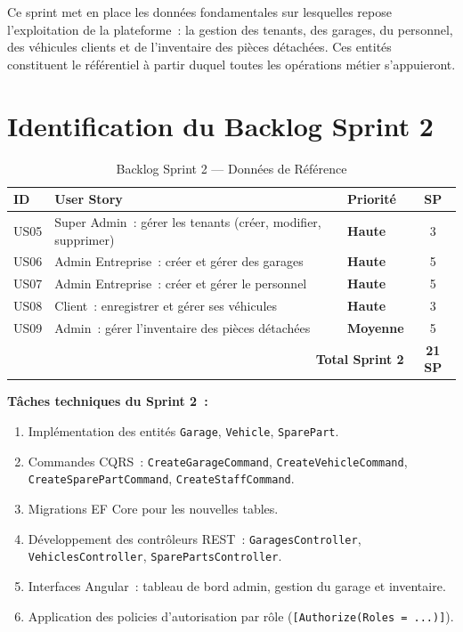 \documentclass[12pt,a4paper]{report}
\begin{document}
Ce sprint met en place les données fondamentales sur lesquelles repose l'exploitation
de la plateforme~: la gestion des tenants, des garages, du personnel, des véhicules
clients et de l'inventaire des pièces détachées. Ces entités constituent le référentiel
à partir duquel toutes les opérations métier s'appuieront.

\section{Identification du Backlog Sprint 2}

\begin{table}[H]
\centering
\caption{Backlog Sprint 2 — Données de Référence}
\begin{tabularx}{\textwidth}{|l|X|l|c|}
\hline
\rowcolor{indigolite!60}
\textbf{ID} & \textbf{User Story} & \textbf{Priorité} & \textbf{SP} \\
\hline
US05 & Super Admin~: gérer les tenants (créer, modifier, supprimer) &
  \textcolor{prioH}{\bfseries Haute} & 3 \\
\hline
US06 & Admin Entreprise~: créer et gérer des garages &
  \textcolor{prioH}{\bfseries Haute} & 5 \\
\hline
US07 & Admin Entreprise~: créer et gérer le personnel &
  \textcolor{prioH}{\bfseries Haute} & 5 \\
\hline
US08 & Client~: enregistrer et gérer ses véhicules &
  \textcolor{prioH}{\bfseries Haute} & 3 \\
\hline
US09 & Admin~: gérer l'inventaire des pièces détachées &
  \textcolor{prioM}{\bfseries Moyenne} & 5 \\
\hline
\multicolumn{3}{|r|}{\textbf{Total Sprint 2}} & \textbf{21 SP} \\
\hline
\end{tabularx}
\end{table}

\noindent\textbf{Tâches techniques du Sprint 2~:}
\begin{enumerate}[noitemsep]
  \item Implémentation des entités \texttt{Garage}, \texttt{Vehicle}, \texttt{SparePart}.
  \item Commandes CQRS~: \texttt{CreateGarageCommand}, \texttt{CreateVehicleCommand},
    \texttt{CreateSparePartCommand}, \texttt{CreateStaffCommand}.
  \item Migrations EF Core pour les nouvelles tables.
  \item Développement des contrôleurs REST~: \texttt{GaragesController},
    \texttt{VehiclesController}, \texttt{SparePartsController}.
  \item Interfaces Angular~: tableau de bord admin, gestion du garage et inventaire.
  \item Application des policies d'autorisation par rôle (\texttt{[Authorize(Roles = ...)]}).
\end{enumerate}
\end{document}

